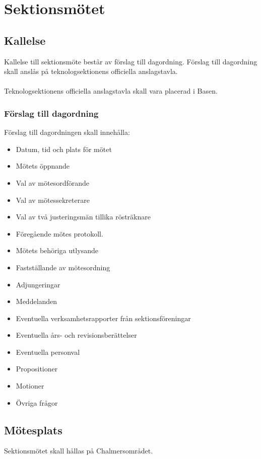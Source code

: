 \documentclass[a4paper, 10pt]{article}
\begin{document}
\newpage
\setcounter{tocdepth}{2}
\tableofcontents
\newpage

\section{Sektionsmötet}

\subsection{Kallelse} 
Kallelse till sektionsmöte består av förslag till dagordning. Förslag till dagordning skall anslås på teknologsektionens officiella anslagstavla. \\\\
Teknologsektionens officiella anslagstavla skall vara placerad i Basen. 
\subsubsection{Förslag till dagordning}
Förslag till dagordningen skall innehålla:
\begin{itemize}  
  \item Datum, tid och plats för mötet 
  \item Mötets öppnande 
  \item Val av mötesordförande 
  \item Val av mötessekreterare 
  \item Val av två justeringsmän tillika rösträknare 
  \item Föregående mötes protokoll. 
  \item Mötets behöriga utlysande 
  \item Fastställande av mötesordning 
  \item Adjungeringar 
  \item Meddelanden 
  \item Eventuella verksamhetsrapporter från sektionsföreningar 
  \item Eventuella års- och revisionsberättelser 
  \item Eventuella personval 
  \item Propositioner 
  \item Motioner 
  \item Övriga frågor 
\end{itemize}
\subsection{Mötesplats} 
Sektionsmötet skall hållas på Chalmersområdet. 
\end{document}

